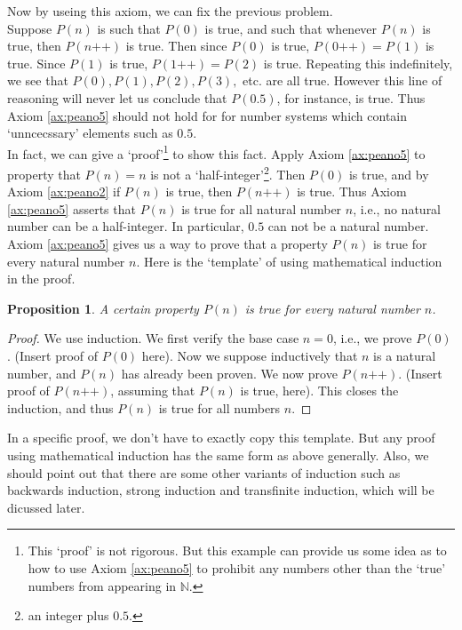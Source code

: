 \documentclass[a4paper,oneside]{book}
\newtheorem*{proof}{\textit{Proof.}}
\newtheorem{proposition}{Proposition}[section]
\begin{document}
			Now by useing this axiom, we can fix the previous problem.\\
			Suppose $P(n)$ is such that $P(0)$ is true, and such that whenever $P(n)$ is true, then $P(n \texttt{++})$ is true. Then since $P(0)$ is true, $P(0 \texttt{++}) = P(1)$ is true. Since $P(1)$ is true, $P(1 \texttt{++}) = P(2)$ is true. Repeating this indefinitely, we see that $P(0), P(1), P(2), P(3),$ etc. are all true. However this line of reasoning will never let us conclude that $P(0.5)$, for instance, is true. Thus Axiom \ref{ax:peano5} should not hold for for number systems which contain `unncecssary' elements such as $0.5$.\\
			In fact, we can give a `proof'\footnote{This `proof' is not rigorous. But this example can provide us some idea as to how to use Axiom \ref{ax:peano5} to prohibit any numbers other than the `true' numbers from appearing in $\mathbb{N}$.} to show this fact. Apply Axiom \ref{ax:peano5} to property that $P(n)= n$ is not a `half-integer'\footnote{an integer plus $0.5$.}. Then $P(0)$ is true, and by Axiom \ref{ax:peano2} if $P(n)$ is true, then $P(n\texttt{++})$ is true. Thus Axiom \ref{ax:peano5} asserts that $P(n)$ is true for all natural number $n$, i.e., no natural number can be a half-integer. In particular, $0.5$ can not be a natural number.\\
			Axiom \ref{ax:peano5} gives us a way to prove that a property $P(n)$ is true for every natural number $n$. Here is the `template' of using mathematical induction in the proof.
			\begin{proposition}
				A certain property $P(n)$ is true for every natural number $n$.
			\end{proposition}
			\begin{proof}
				We use induction. We first verify the base case $n=0$, i.e., we prove $P(0)$. (Insert proof of $P(0)$ here). Now we suppose inductively that $n$ is a natural number, and $P(n)$ has already been proven. We now prove $P(n\texttt{++})$. (Insert proof of $P(n \texttt{++})$, assuming that $P(n)$ is true, here). This closes the induction, and thus $P(n)$ is true for all numbers $n$.
			\end{proof}
			In a specific proof, we don't have to exactly copy this template. But any proof using mathematical induction has the same form as above generally. Also, we should point out that there are some other variants of induction such as backwards induction, strong induction and transfinite induction, which will be dicussed later.\\
\end{document}
